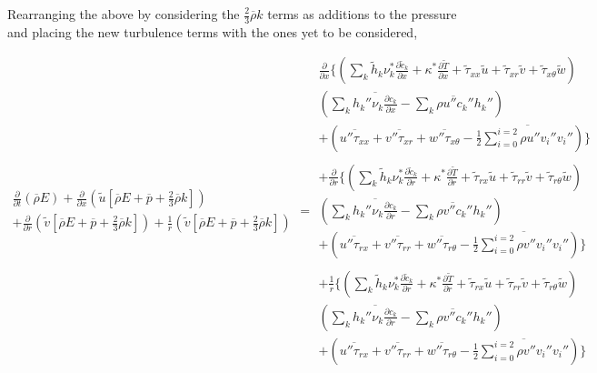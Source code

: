 	Rearranging the above by considering the $\frac{2}{3}\overline{\rho}k$ terms as additions to the pressure
and placing the new turbulence terms with the ones yet to be considered,

\begin{displaymath}
	\begin{array}{c}
		\frac{\partial}{\partial t}(\overline{\rho}E) +
		\frac{\partial}{\partial x}(\tilde u[\overline{\rho}E + \overline{p} + \frac{2}{3}\overline{\rho}k]) \\ +
		\frac{\partial}{\partial r}(\tilde v[\overline{\rho}E + \overline{p} + \frac{2}{3}\overline{\rho}k]) +
		\frac{1}{r}(\tilde v[\overline{\rho}E + \overline{p} + \frac{2}{3}\overline{\rho}k])
	\end{array} = 
	\begin{array}{c}
		\frac{\partial}{\partial x}\Big\{
		(\sum_{k}\tilde h_k \nu_k^* \frac{\partial \tilde c_k}{\partial x} + \kappa^*\frac{\partial \tilde T}
		{\partial x} + \tilde \tau_{xx} \tilde u + \tilde \tau_{xr} \tilde v + \tilde \tau_{x\theta} \tilde w) 
	 	\\
		(\sum_k \overline{h_k'' \nu_k \frac{\partial c_k}{\partial x}} - \overline{\sum_k \rho u'' c_k'' h_k''})
		\\
		+ (\overline{u''\tau_{xx}} + \overline{v''\tau_{xr}} + \overline{w''\tau_{x\theta}} 
		-\frac{1}{2}\overline{\sum_{i=0}^{i=2} \rho u'' v_i'' v_i''}) \Big\} 
		\\ \\ + 
		\frac{\partial}{\partial r}\Big\{
		(\sum_{k}\tilde h_k \nu_k^* \frac{\partial \tilde c_k}{\partial r} + \kappa^*\frac{\partial \tilde T}
		{\partial r} + \tilde \tau_{rx} \tilde u + \tilde \tau_{rr} \tilde v + \tilde \tau_{r\theta} \tilde w) 
	 	\\
		(\sum_k \overline{h_k'' \nu_k \frac{\partial c_k}{\partial r}} - \overline{\sum_k \rho v'' c_k'' h_k''})
		\\
		+ (\overline{u''\tau_{rx}} + \overline{v''\tau_{rr}} + \overline{w''\tau_{r\theta}} 
		-\frac{1}{2}\overline{\sum_{i=0}^{i=2} \rho v'' v_i'' v_i''}) \Big\} 
		\\ \\+ 
		\frac{1}{r}\Big\{
		(\sum_{k}\tilde h_k \nu_k^* \frac{\partial \tilde c_k}{\partial r} + \kappa^*\frac{\partial \tilde T}
		{\partial r} + \tilde \tau_{rx} \tilde u + \tilde \tau_{rr} \tilde v + \tilde \tau_{r\theta} \tilde w) 
	 	\\
		(\sum_k \overline{h_k'' \nu_k \frac{\partial c_k}{\partial r}} - \overline{\sum_k \rho v'' c_k'' h_k''})
		\\
		+ (\overline{u''\tau_{rx}} + \overline{v''\tau_{rr}} + \overline{w''\tau_{r\theta}} 
		-\frac{1}{2}\overline{\sum_{i=0}^{i=2} \rho v'' v_i'' v_i''}) \Big\} 
	\end{array}
\end{displaymath}

